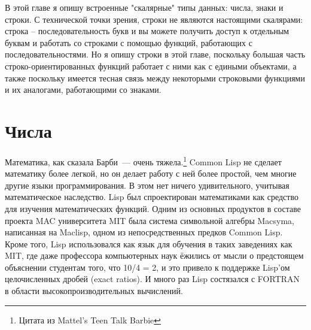 В этой главе я опишу встроенные "скалярные" типы данных: числа, знаки и строки.  С
технической точки зрения, строки не являются настоящими скалярами: строка --
последовательность букв и вы можете получить доступ к отдельным буквам и работать со
строками с помощью функций, работающих с последовательностями.  Но я опишу строки в этой
главе, поскольку большая часть строко-ориентированных функций работает с ними как с
едиными объектами, а также поскольку имеется тесная связь между некоторыми строковыми
функциями и их аналогами, работающими со знаками.

\section{Числа}

Математика, как сказала Барби~--- очень тяжела.\footnote{Цитата из Mattel's Teen Talk
  Barbie} Common Lisp не сделает математику более легкой, но он делает работу с ней более
простой, чем многие другие языки программирования.  В этом нет ничего удивительного,
учитывая математическое наследство.  Lisp был спроектирован математиками как средство для
изучения математических функций.  Одним из основных продуктов в составе проекта MAC
университета MIT была система символьной алгебры Macsyma, написанная на Maclisp, одном из
непосредственных предков Common Lisp.  Кроме того, Lisp использовался как язык для
обучения в таких заведениях как MIT, где даже профессора компьютерных наук ёжились от
мысли о предстоящем объяснении студентам того, что 10/4 = 2, и это привело к поддержке
Lisp'ом целочисленных дробей (exact ratios).  И много раз Lisp состязался с FORTRAN в
области высокопроизводительных вычислений.

